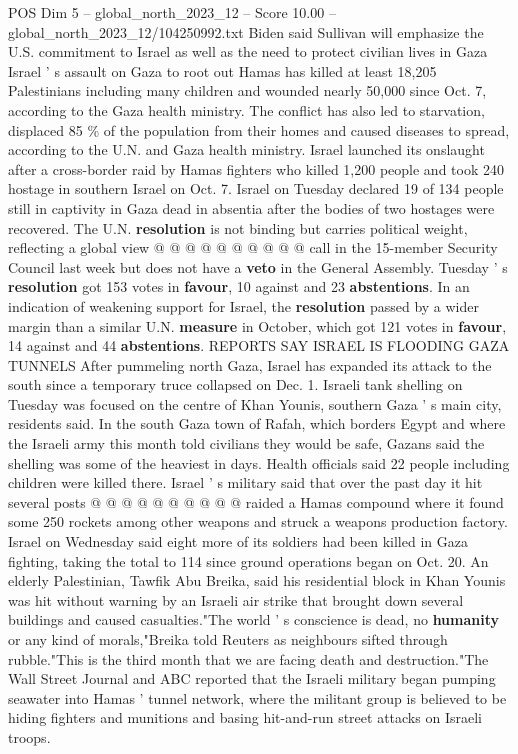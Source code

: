 \begin{textsample}{POS Dim 5 – global\_north\_2023\_12 – Score 10.00 – global\_north\_2023\_12/104250992.txt}
Biden said Sullivan will emphasize the U.S. commitment to Israel as well as the need to protect civilian lives in Gaza Israel ' s assault on Gaza to root out Hamas has killed at least 18,205 Palestinians including many children and wounded nearly 50,000 since Oct. 7, according to the Gaza health ministry.
The conflict has also led to starvation, displaced 85 \% of the population from their homes and caused diseases to spread, according to the U.N. and Gaza health ministry.
Israel launched its onslaught after a cross-border raid by Hamas fighters who killed 1,200 people and took 240 hostage in southern Israel on Oct. 7.
Israel on Tuesday declared 19 of 134 people still in captivity in Gaza dead in absentia after the bodies of two hostages were recovered.
The U.N. \textbf{resolution} is not binding but carries political weight, reflecting a global view @ @ @ @ @ @ @ @ @ @ call in the 15-member Security Council last week but does not have a \textbf{veto} in the General Assembly.
Tuesday ' s \textbf{resolution} got 153 votes in \textbf{favour}, 10 against and 23 \textbf{abstentions}.
In an indication of weakening support for Israel, the \textbf{resolution} passed by a wider margin than a similar U.N. \textbf{measure} in October, which got 121 votes in \textbf{favour}, 14 against and 44 \textbf{abstentions}.
REPORTS SAY ISRAEL IS FLOODING GAZA TUNNELS After pummeling north Gaza, Israel has expanded its attack to the south since a temporary truce collapsed on Dec. 1.
Israeli tank shelling on Tuesday was focused on the centre of Khan Younis, southern Gaza ' s main city, residents said.
In the south Gaza town of Rafah, which borders Egypt and where the Israeli army this month told civilians they would be safe, Gazans said the shelling was some of the heaviest in days.
Health officials said 22 people including children were killed there.
Israel ' s military said that over the past day it hit several posts @ @ @ @ @ @ @ @ @ @ raided a Hamas compound where it found some 250 rockets among other weapons and struck a weapons production factory.
Israel on Wednesday said eight more of its soldiers had been killed in Gaza fighting, taking the total to 114 since ground operations began on Oct. 20.
An elderly Palestinian, Tawfik Abu Breika, said his residential block in Khan Younis was hit without warning by an Israeli air strike that brought down several buildings and caused casualties."The world ' s conscience is dead, no \textbf{humanity} or any kind of morals,"Breika told Reuters as neighbours sifted through rubble."This is the third month that we are facing death and destruction."The Wall Street Journal and ABC reported that the Israeli military began pumping seawater into Hamas ' tunnel network, where the militant group is believed to be hiding fighters and munitions and basing hit-and-run street attacks on Israeli troops.

\end{textsample}

